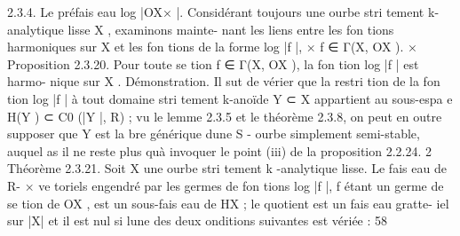 \documentclass[
  10pt,
]{article}
\newenvironment{Shaded}{}{}
\newcommand{\NormalTok}[1]{#1}
\begin{document}
\begin{Shaded}
\begin{Highlighting}[]
\NormalTok{2.3.4. Le préfais eau log |OX× |.}
\NormalTok{  Considérant toujours une ourbe stri tement k{-}analytique lisse X , examinons mainte{-}}
\NormalTok{nant les liens entre les fon tions harmoniques sur X et les fon tions de la forme log |f |,}
\NormalTok{            ×}
\NormalTok{f ∈ Γ(X, OX   ).}
\NormalTok{                                                   ×}
\NormalTok{Proposition 2.3.20.  Pour toute se tion f ∈ Γ(X, OX ), la fon tion log |f | est harmo{-}}
\NormalTok{nique sur X .}
\NormalTok{Démonstration. Il sut de vérier que la restri tion de la fon tion log |f | à tout domaine}
\NormalTok{stri tement k{-}anoïde Y ⊂ X appartient au sous{-}espa e H(Y ) ⊂ C0 (|Y |, R) ; vu le lemme}
\NormalTok{2.3.5 et le théorème 2.3.8, on peut en outre supposer que Y est la bre générique d\textquotesingle{}une S {-}}
\NormalTok{ ourbe simplement semi{-}stable, auquel as il ne reste plus qu\textquotesingle{}à invoquer le point (iii) de la}
\NormalTok{proposition 2.2.24.                                                                              2}
\NormalTok{Théorème 2.3.21.  Soit X une ourbe stri tement k {-}analytique lisse. Le fais eau de R{-}}
\NormalTok{                                                                                                 ×}
\NormalTok{ve toriels engendré par les germes de fon tions log |f |, f étant un germe de se tion de OX        ,}
\NormalTok{est un sous{-}fais eau de HX ; le quotient est un fais eau gratte{-} iel sur |X| et il est nul si l\textquotesingle{}une}
\NormalTok{des deux onditions suivantes est vériée :}
\NormalTok{58}




\end{Highlighting}
\end{Shaded}
\end{document}
